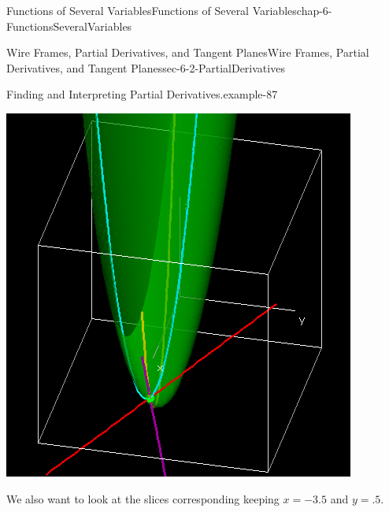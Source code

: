 \documentclass[oneside,10pt,]{book}
\numberwithin{equation}{section}
\begin{document}
\begin{chapterptx}{Functions of Several Variables}{}{Functions of Several Variables}{}{}{chap-6-FunctionsSeveralVariables}
\begin{sectionptx}{Wire Frames, Partial Derivatives, and Tangent Planes}{}{Wire Frames, Partial Derivatives, and Tangent Planes}{}{}{sec-6-2-PartialDerivatives}
\begin{example}{Finding and Interpreting Partial Derivatives.}{example-87}
\begin{sidebyside}{1}{0.2}{0.2}{0}
\begin{sbspanel}{0.6}
\includegraphics[width=1\linewidth]{images/sec-6-2-5.png}
\end{sbspanel}%
\end{sidebyside}%
\par
\hypertarget{p-2221}{}%
We also want to look at the slices corresponding keeping \(x=-3.5\) and \(y=.5\).%
\begin{sidebyside}{1}{0.3}{0.3}{0}%
\begin{sbspanel}{0.4}%

\end{sbspanel}
\end{sidebyside}
\end{example}
\end{sectionptx}
\end{chapterptx}
\end{document}
